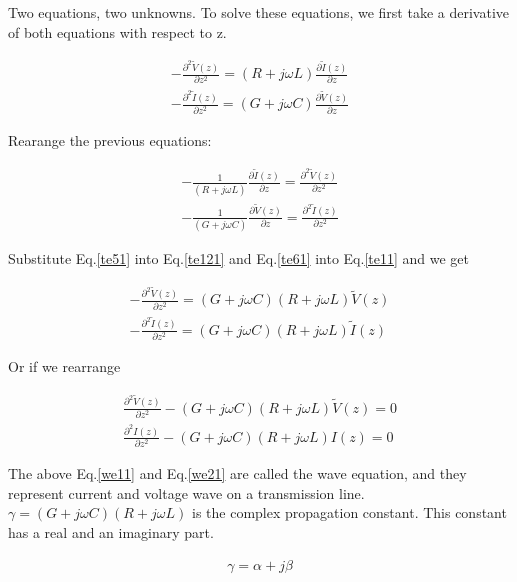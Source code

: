 \documentclass{ximera}
\begin{document}
Two equations, two unknowns. To solve these equations, we first
take a derivative of both equations with respect to z. 

\begin{eqnarray}
-\frac{\partial^2 \tilde{V}(z)}{\partial z^2}=  (R+j\omega L) \frac{\partial
 \tilde{I}(z)}{\partial z}  \label{teleg3} \\
-\frac{\partial^2 \tilde{I}(z)}{\partial z^2}=  (G+j\omega C) \frac{\partial
 \tilde{V}(z)}{\partial z} \label{teleg4}
\end{eqnarray}

Rearange the previous equations:



\begin{eqnarray}
- \frac{1}{ (R+j\omega L)} \frac{\partial \tilde{I}(z)}{\partial z}= \frac{\partial^2
  \tilde{V}(z)}{\partial z^2} \label{te51} \\
-\frac{1}{ (G+j\omega C)} \frac{\partial \tilde{V}(z)}{\partial z}= \frac{\partial^2
  \tilde{I}(z)}{\partial z^2} \label{te61}
\end{eqnarray}

Substitute  Eq.\ref{te51} into  Eq.\ref{te121}
and Eq.\ref{te61} into Eq.\ref{te11} and we get

\begin{eqnarray}
-\frac{\partial^2 \tilde{V}(z)}{\partial z^2}=(G+j\omega C)(R+j\omega L) \tilde{V}(z) \label{teleg1} \\
-\frac{\partial^2 \tilde{I}(z)}{\partial z^2}= (G+j\omega C)  (R+j\omega L) \label{teleg2}
\tilde{I}(z) 
\end{eqnarray}

Or if we rearrange


\begin{eqnarray}
\frac{\partial^2 \tilde{V}(z)}{\partial z^2} -(G+j\omega C)(R+j\omega L)
 \tilde{V}(z)=0  \label{we11} \\ 
\frac{\partial^2 I(z)}{\partial z^2}- (G+j\omega C)  (R+j\omega L)
I(z)=0 \label{we21}
\end{eqnarray}

The above Eq.\ref{we11} and Eq.\ref{we21} are called the wave equation, and they represent
current and voltage wave on a transmission line. $\gamma=(G+j\omega
C)(R+j\omega L)$ is the complex propagation constant. This constant
has a real and an imaginary part.

\begin{eqnarray}
\gamma= \alpha + j \beta \nonumber
\end{eqnarray}
\end{document}

